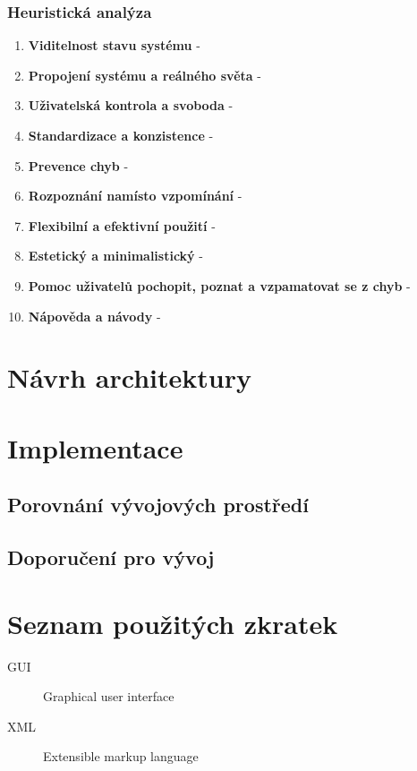 \documentclass[thesis=M,czech]{FITthesis}[2012/06/26]
\begin{document}
\subsection{Heuristická analýza}

\begin{enumerate}
	\item
	\textbf{Viditelnost stavu systému} -
	\item
	\textbf{Propojení systému a reálného světa} -
	\item
	\textbf{Uživatelská kontrola a svoboda} -
	\item
	\textbf{Standardizace a konzistence} -
	\item
	\textbf{Prevence chyb} -
	\item
	\textbf{Rozpoznání namísto vzpomínání} -
	\item
	\textbf{Flexibilní a efektivní použití} -
	\item
	\textbf{Estetický a minimalistický} -
	\item
	\textbf{Pomoc uživatelů pochopit, poznat a vzpamatovat se z chyb} -
	\item
	\textbf{Nápověda a návody} -
\end{enumerate} 

\chapter{Návrh architektury}

\chapter{Implementace}

\section{Porovnání vývojových prostředí}

\section{Doporučení pro vývoj}

\begin{conclusion}
\end{conclusion}




\appendix

\chapter{Seznam použitých zkratek}
\begin{description}
	\item[GUI] Graphical user interface
	\item[XML] Extensible markup language
\end{description}
\end{document}
